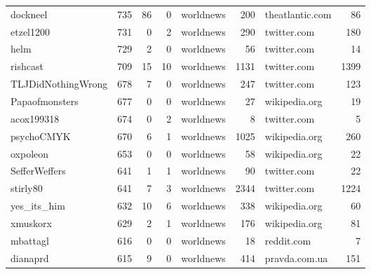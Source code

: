 \begin{tabular}{lrrrlrlr}
dockneel            &   735 &          86 &           0 &    worldnews &       200 &  theatlantic.com &        86 \\
etzel1200           &   731 &           0 &           2 &    worldnews &       290 &      twitter.com &       180 \\
helm                &   729 &           2 &           0 &    worldnews &        56 &      twitter.com &        14 \\
rishcast            &   709 &          15 &          10 &    worldnews &      1131 &      twitter.com &      1399 \\
TLJDidNothingWrong  &   678 &           7 &           0 &    worldnews &       247 &      twitter.com &       123 \\
Papaofmonsters      &   677 &           0 &           0 &    worldnews &        27 &    wikipedia.org &        19 \\
acox199318          &   674 &           0 &           2 &    worldnews &         8 &      twitter.com &         5 \\
psychoCMYK          &   670 &           6 &           1 &    worldnews &      1025 &    wikipedia.org &       260 \\
oxpoleon            &   653 &           0 &           0 &    worldnews &        58 &    wikipedia.org &        22 \\
SefferWeffers       &   641 &           1 &           1 &    worldnews &        90 &      twitter.com &        22 \\
stirly80            &   641 &           7 &           3 &    worldnews &      2344 &      twitter.com &      1224 \\
yes\_its\_him         &   632 &          10 &           6 &    worldnews &       338 &    wikipedia.org &        60 \\
xmuskorx            &   629 &           2 &           1 &    worldnews &       176 &    wikipedia.org &        81 \\
mbattagl            &   616 &           0 &           0 &    worldnews &        18 &       reddit.com &         7 \\
dianaprd            &   615 &           9 &           0 &    worldnews &       414 &    pravda.com.ua &       151 \\
\bottomrule
\end{tabular}
